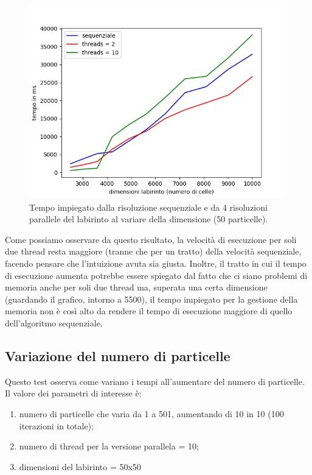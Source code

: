 \documentclass[10pt,twocolumn,letterpaper]{article}
\begin{document}
\begin{figure}[H]
\includegraphics[width=1.1\linewidth]{test/dimTestV2/result.png}
\caption{\small Tempo impiegato dalla risoluzione sequenziale e da 4 risoluzioni parallele del labirinto al variare della dimensione (50 particelle).}
\label{t1_2}
\end{figure}

Come possiamo osservare da questo risultato, la velocità di esecuzione per soli due thread resta maggiore (tranne che per un tratto) della velocità sequenziale, facendo pensare che l'intuizione avuta sia giusta. Inoltre, il tratto in cui il tempo di esecuzione aumenta potrebbe essere spiegato dal fatto che ci siano problemi di memoria anche per soli due thread ma, superata una certa dimensione (guardando il grafico, intorno a 5500), il tempo impiegato per la gestione della memoria non è così alto da rendere il tempo di esecuzione maggiore di quello dell'algoritmo sequenziale.

\subsection{Variazione del numero di particelle}

Questo test osserva come variano i tempi all'aumentare del numero di particelle.\\
Il valore dei parametri di interesse è:
\begin{enumerate}[-]
\item{numero di particelle che varia da 1 a 501, aumentando di 10 in 10 (100 iterazioni in totale);}
\item{numero di thread per la versione parallela = 10;}
\item{dimensioni del labirinto = 50x50}
\end{enumerate}
\end{document}
